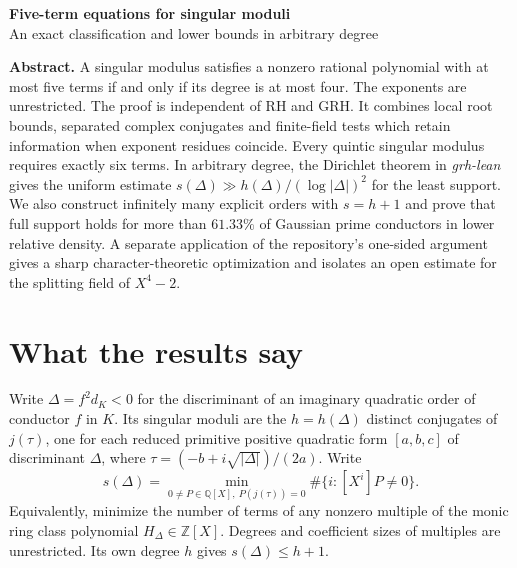 \documentclass[11pt]{article}
\newcommand{\Q}{\mathbb Q}\newcommand{\Z}{\mathbb Z}\newcommand{\F}{\mathbb F}
\begin{document}
\thispagestyle{plain}
\vspace{14pt}
\begin{center}{\LARGE\bfseries\color{ink} Five-term equations for singular moduli}\\[7pt]
{\large An exact classification and lower bounds in arbitrary degree}
\end{center}
\vspace{3pt}
\noindent\textbf{Abstract.}
A singular modulus satisfies a nonzero rational polynomial with at most five terms if and only if its degree is at most four. The exponents are unrestricted. The proof is independent of RH and GRH. It combines local root bounds, separated complex conjugates and finite-field tests which retain information when exponent residues coincide. Every quintic singular modulus requires exactly six terms. In arbitrary degree, the Dirichlet theorem in \emph{grh-lean} gives the uniform estimate $s(\Delta)\gg h(\Delta)/(\log|\Delta|)^2$ for the least support. We also construct infinitely many explicit orders with $s=h+1$ and prove that full support holds for more than $61.33\%$ of Gaussian prime conductors in lower relative density. A separate application of the repository's one-sided argument gives a sharp character-theoretic optimization and isolates an open estimate for the splitting field of $X^4-2$.

\section{What the results say}
Write $\Delta=f^2d_K<0$ for the discriminant of an imaginary quadratic order of conductor $f$ in $K$. Its singular moduli are the $h=h(\Delta)$ distinct conjugates of $j(\tau)$, one for each reduced primitive positive quadratic form $[a,b,c]$ of discriminant $\Delta$, where $\tau=(-b+i\sqrt{|\Delta|})/(2a)$. Write
\[
 s(\Delta)=\min_{0\ne P\in\Q[X],\ P(j(\tau))=0}\#\{i:[X^i]P\ne0\}.
\]
Equivalently, minimize the number of terms of any nonzero multiple of the monic ring class polynomial $H_\Delta\in\Z[X]$. Degrees and coefficient sizes of multiples are unrestricted. Its own degree $h$ gives $s(\Delta)\le h+1$.
\end{document}
